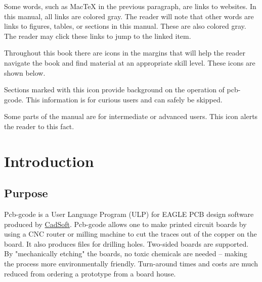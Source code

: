 \documentclass[11pt]{book}
\begin{document}
\noindent Some words, such as MacTeX in the previous paragraph, are links to websites. In this manual, all links are colored gray. The reader will note that other words are links to figures, tables, or sections in this manual. These are also colored gray. The reader may click these links to jump to the linked item.
\vspace{1ex}

\noindent Throughout this book there are icons in the margins that will help the reader navigate the book and find material at an appropriate skill level. These icons are shown below.
\vspace{5ex}

\howitworks{} \noindent Sections marked with this icon provide background on the operation of pcb-gcode. This information is for curious users and can safely be skipped.
\vspace{10ex}


\warning{} \noindent Some parts of the manual are for intermediate or advanced users. This icon alerts the reader to this fact.

\tableofcontents

\listoffigures

\listoftables

\mainmatter

%
\chapter{Introduction}\label{chp:Introduction}
%

%
%
\section{Purpose}\label{sec:Purpose}

Pcb-gcode is a User Language Program (ULP) for EAGLE PCB design software produced by \href{http://cadsoftusa.com}{CadSoft}. Pcb-gcode allows one to make printed circuit boards by using a CNC router or milling machine to cut the traces out of the copper on the board. It also produces files for drilling holes. Two-sided boards are supported. By "mechanically etching" the boards, no toxic chemicals are needed -- making the process more environmentally friendly. Turn-around times and costs are much reduced from ordering a prototype from a board house.
\end{document}
